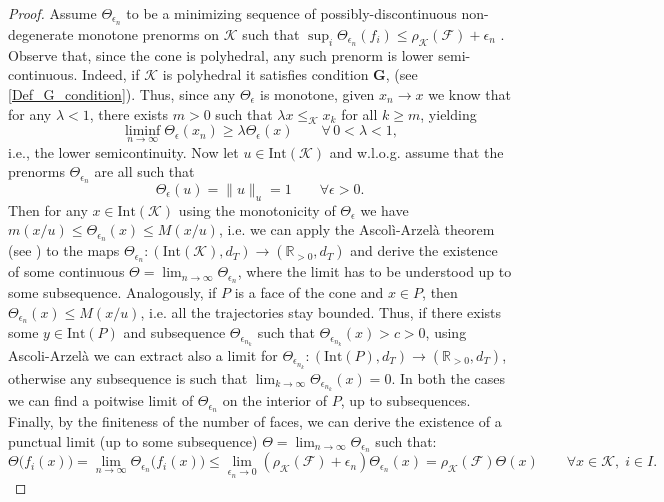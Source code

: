 \documentclass{article}
\newcommand{\R}{\mathbb{R}}
\newcommand{\family}{\mathcal{F}}
\newcommand{\cradius}{\rho_{\cone}}
\newcommand{\cone}{\mathcal{K}}
\newcommand{\interior}{\mathrm{Int}}
\newcommand{\distT}{d_T}
\newcommand{\cleq}{\leq_{\cone}}
\begin{document}
\begin{proof}
Assume $\Theta_{\epsilon_n}$ to be a minimizing sequence of possibly-discontinuous non-degenerate monotone prenorms on $\cone$ such that $\sup_i \Theta_{\epsilon_n}(f_i)\leq \cradius(\family)+\epsilon_n$ .
Observe that, since the cone is polyhedral, any such prenorm is lower semi-continuous. Indeed, if $\cone$ is polyhedral it satisfies condition \textbf{G}, (see \ref{Def_G_condition}).
Thus, since any $\Theta_{\epsilon}$ is monotone, given $x_n\rightarrow x$ we know that for any $\lambda<1$, there exists $m>0$ such that $\lambda x\cleq x_k$ for all $k\geq m$, yielding 
\begin{equation}
    \liminf_{n\rightarrow \infty} \Theta_\epsilon(x_n)\geq \lambda\Theta_\epsilon(x) \qquad \forall \,0<\lambda<1,
\end{equation}
i.e., the lower semicontinuity.
%
Now let $u\in \interior(\cone)$ and w.l.o.g. assume that the prenorms $\Theta_{\epsilon_n}$ are all such that 
\begin{equation}
    \Theta_\epsilon(u)=\|u\|_u=1 \qquad \forall \epsilon>0.
\end{equation}
%
Then for any $x\in\interior(\cone)$ using the monotonicity of $\Theta_{\epsilon}$ we have $m(x/u)\leq \Theta_{\epsilon_n}(x)\leq M(x/u)$, i.e. we can apply the Ascolì-Arzelà theorem (see ) to the maps $\Theta_{\epsilon_n}:(\interior(\cone), \distT)\rightarrow (\R_{>0},\distT)$ and derive the existence of some continuous $\Theta=\lim_{n\rightarrow \infty}\Theta_{\epsilon_n}$, where the limit has to be understood up to some subsequence.
%
Analogously, if $P$ is a face of the cone and $x\in P$, then $\Theta_{\epsilon_n}(x)\leq M(x/u)$, i.e. all the trajectories stay bounded. 
%
Thus, if there exists some $y\in \interior(P)$ and subsequence $\Theta_{\epsilon_{n_k}}$ such that $\Theta_{\epsilon_{n_k}}(x)>c>0$, using Ascoli-Arzelà we can extract also a limit for $\Theta_{\epsilon_{n_k}}:(\interior(P), \distT)\rightarrow (\R_{>0},\distT)$, otherwise any subsequence is such that $\lim_{k\rightarrow \infty}\Theta_{\epsilon_{n_k}}(x)=0$. In both the cases we can find a poitwise limit of $\Theta_{\epsilon_n}$ on the interior of $P$, up to subsequences. 
%
Finally, by the finiteness of the number of faces, we can derive the existence of a punctual limit (up to some subsequence) $\Theta=\lim_{n\rightarrow \infty}\Theta_{\epsilon_n}$ such that:
%
\begin{equation}    \Theta\big(f_i(x)\big)=\lim_{n\rightarrow \infty}\Theta_{\epsilon_n}\big(f_i(x)\big)\leq \lim_{\epsilon_n\rightarrow 0}(\cradius(\family)+\epsilon_n) \Theta_{\epsilon_n}(x)=\cradius(\family)\Theta(x) \qquad \forall x\in \cone,\; i\in I.

\end{equation}
\end{proof}
\end{document}
